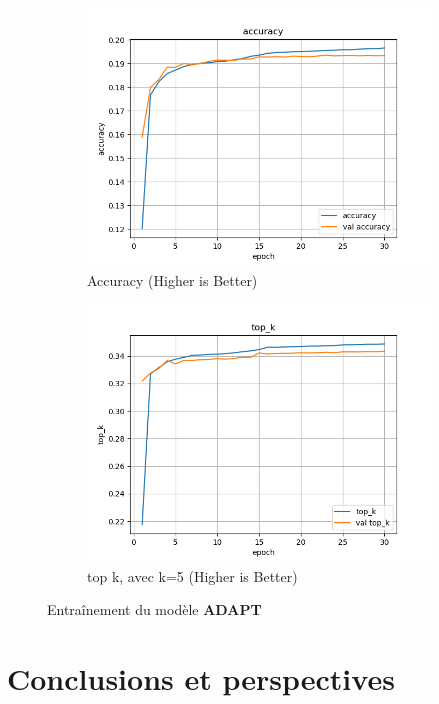 \documentclass[a4paper]{article}
\begin{document}
\begin{figure}[ht]
  \begin{subfigure}{0.47\textwidth}
    \includegraphics[width=\linewidth]{../logs/learnfromword2vect_0/accuracy.png}
    \caption{Accuracy (Higher is Better)}
  \end{subfigure}
  \hfill
  \begin{subfigure}{0.47\textwidth}
    \includegraphics[width=\linewidth]{../logs/learnfromword2vect_0/top_k.png}
    \caption{top k, avec k=5 (Higher is Better)}
  \end{subfigure}
  \caption{Entraînement du modèle \textbf{ADAPT}}
  \label{subfig:result model 3}
\end{figure}


\section{Conclusions et perspectives}
\end{document}
